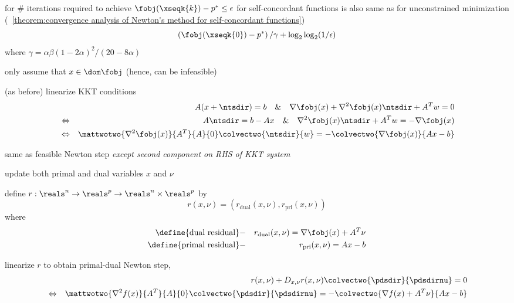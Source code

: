 \documentclass[17pt,landscape]{foils}
\begin{document}
{\vitem
	for \# iterations required to achieve $\fobj(\xseqk{k})-p^\ast \leq \epsilon$
	for self-concordant functions
	is also same as
	for unconstrained minimization
	(\theoremname~\ref{theorem:convergence analysis of Newton's method for self-concordant functions})
	$$
		\left(\fobj(\xseqk{0}) - p^\ast\right)/{\gamma}
		+ \log_2 \log_2 (1 / \epsilon)
	$$
	where $\gamma = \alpha \beta (1-2\alpha)^2 / (20-8\alpha)$
\eit
\vfill



\bit
\item
	only assume that $x\in\dom \fobj$ (hence, can be infeasible)

\vitem
	(as before) linearize KKT conditions
	\begin{eqnarray*}
	&&
		A(x+\ntsdir) = b
		\quad
		\&
		\quad
		\nabla \fobj(x) + \nabla^2 \fobj(x) \ntsdir + A^Tw = 0
	\\
	&\Leftrightarrow&
		A\ntsdir = b - Ax
		\quad
		\&
		\quad
		\nabla^2 \fobj(x) \ntsdir + A^Tw
		=
		- \nabla \fobj(x)
	\\
	&\Leftrightarrow&
		\mattwotwo{\nabla^2 \fobj(x)}{A^T}{A}{0}
		\colvectwo{\ntsdir}{w}
		=
		-
		\colvectwo{\nabla \fobj(x)}{Ax-b}
	\end{eqnarray*}

\vitem
	same as feasible Newton step \emph{except second component on RHS of KKT system}
\eit
\vfill



\bit
\item
	update both primal and dual variables $x$ and $\nu$\

\vitem
	define $r:\reals^n\to\reals^p\to\reals^n\times\reals^p$
	by
	$$
		r(x,\nu) = (r_\mathrm{dual}(x,\nu),r_\mathrm{pri}(x,\nu))
	$$
	where
	\begin{eqnarray*}
		\mbox{\define{dual residual}}
			&
			-
			&
		r_\mathrm{dual}(x,\nu)
			= \nabla \fobj(x) + A^T\nu
			\\
		\mbox{\define{primal residual}}
			&
			-
			&
		r_\mathrm{pri}(x,\nu)
			= Ax-b
	\end{eqnarray*}
\eit

\vfill



\bit
\item
	linearize $r$ to obtain primal-dual Newton step, \ie\
	\begin{eqnarray*}
	&&
		r(x,\nu) + D_{x,\nu} r(x,\nu) \colvectwo{\pdsdir}{\pdsdirnu} = 0
	\\
	&\Leftrightarrow&
		\mattwotwo{\nabla^2f(x)}{A^T}{A}{0}
		\colvectwo{\pdsdir}{\pdsdirnu}
		=
		- \colvectwo{\nabla f(x) + A^T\nu}{Ax-b}
	\end{eqnarray*}

}
\end{document}

